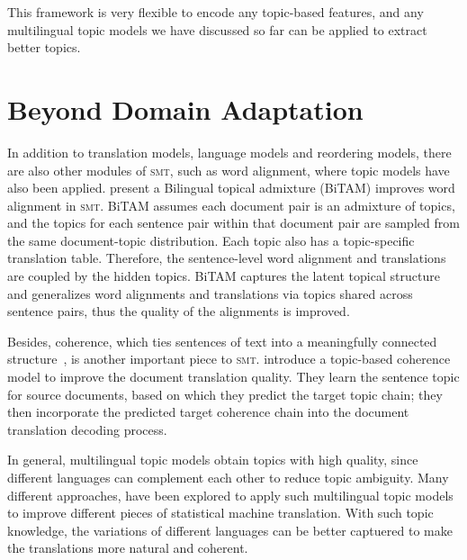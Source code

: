 This framework is very flexible to encode any topic-based features,
and any multilingual topic models we have discussed so far can be
applied to extract better topics.


\section{Beyond Domain Adaptation}

In addition to translation models, language models and reordering models,
there are also other modules of \textsc{smt}, such as word alignment,
where topic models have also been applied.  present a
Bilingual topical admixture (BiTAM) \citet{zhao-06}  improves  word
alignment in \textsc{smt}. BiTAM assumes each document pair is an
admixture of topics, and the topics for each sentence pair within that
document pair are sampled from the same document-topic
distribution. Each topic also has a topic-specific translation
table. Therefore, the sentence-level word alignment and translations
are coupled by the hidden topics.  BiTAM captures the latent
topical structure and generalizes word alignments and translations via
topics shared across sentence pairs, thus the quality of the
alignments is improved.

Besides, coherence, which ties sentences of text into a meaningfully
connected structure~\citep{xiong-13}, is another important piece to
\textsc{smt}.\citet{xiong-13} introduce a topic-based coherence model
to improve the document translation quality. They learn the sentence
topic for source documents, based on which they predict the target
topic chain; they then incorporate the predicted target coherence
chain into the document translation decoding process.


In general, multilingual topic models obtain topics with high quality,
since different languages can complement each other to reduce topic
ambiguity. Many different approaches, have been explored to apply such
multilingual topic models to improve different pieces of statistical
machine translation. With such topic knowledge, the variations of
different languages can be better captuered to make the translations
more natural and coherent.

